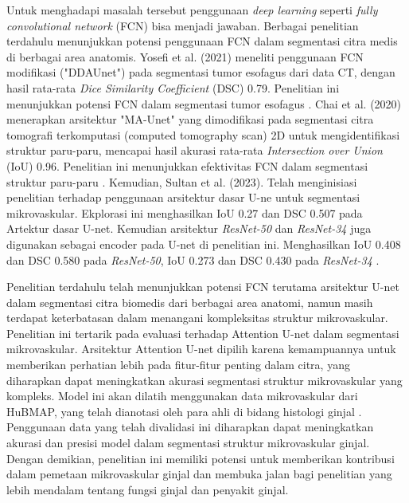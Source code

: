 \noindent Untuk menghadapi masalah tersebut penggunaan \textit{deep learning} seperti \textit{fully convolutional network }(FCN) bisa menjadi jawaban. Berbagai penelitian terdahulu menunjukkan potensi penggunaan FCN dalam segmentasi citra medis di berbagai area anatomis. Yosefi et al. (2021) meneliti penggunaan FCN modifikasi ("DDAUnet") pada segmentasi tumor esofagus dari data CT, dengan hasil rata-rata \textit{Dice Similarity Coefficient} (DSC) 0.79. Penelitian ini menunjukkan potensi FCN dalam segmentasi tumor esofagus \cite{yousefi_esophageal_2021}. Chai et al. (2020) menerapkan arsitektur "MA-Unet" yang dimodifikasi pada segmentasi citra tomografi terkomputasi (computed tomography scan) 2D untuk mengidentifikasi struktur paru-paru, mencapai hasil akurasi rata-rata \textit{Intersection over Union} (IoU) 0.96. Penelitian ini menunjukkan efektivitas FCN dalam segmentasi struktur paru-paru \cite{cai_ma-unet_2020}.
Kemudian, Sultan et al. (2023). Telah menginisiasi penelitian terhadap penggunaan arsitektur dasar U-ne untuk segmentasi mikrovaskular. Ekplorasi ini menghasilkan IoU 0.27 dan DSC 0.507 pada Artektur dasar U-net. Kemudian arsitektur \textit{ResNet-50} dan \textit{ResNet-34} juga digunakan sebagai encoder pada U-net di penelitian ini. Menghasilkan IoU 0.408 dan DSC 0.580 pada \textit{ResNet-50}, IoU 0.273 dan DSC 0.430 pada \textit{ResNet-34} \cite{sultan_microvasculature_2023}.


\noindent Penelitian terdahulu telah menunjukkan potensi FCN terutama arsitektur U-net dalam segmentasi citra biomedis dari berbagai area anatomi, namun masih terdapat keterbatasan dalam menangani kompleksitas struktur mikrovaskular. Penelitian ini tertarik pada evaluasi terhadap Attention U-net dalam segmentasi mikrovaskular. Arsitektur Attention U-net dipilih karena kemampuannya untuk memberikan perhatian lebih pada fitur-fitur penting dalam citra, yang diharapkan dapat meningkatkan akurasi segmentasi struktur mikrovaskular yang kompleks. Model ini akan dilatih menggunakan data mikrovaskular dari HuBMAP, yang telah dianotasi oleh para ahli di bidang histologi ginjal \cite{howard_hubmap_2023}. Penggunaan data yang telah divalidasi ini diharapkan dapat meningkatkan akurasi dan presisi model dalam segmentasi struktur mikrovaskular ginjal. Dengan demikian, penelitian ini memiliki potensi untuk memberikan kontribusi dalam pemetaan mikrovaskular ginjal dan membuka jalan bagi penelitian yang lebih mendalam tentang fungsi ginjal dan penyakit ginjal. 

